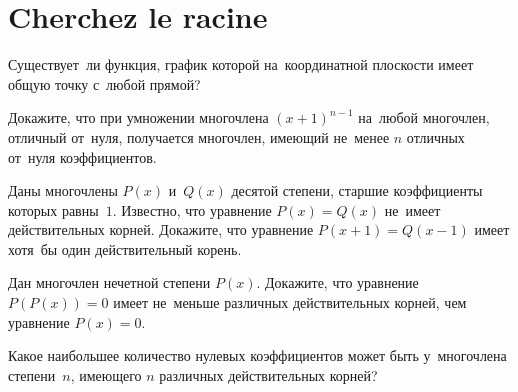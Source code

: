 
\section*{Cherchez le racine}


\begin{problems}

\item
Существует~ли функция, график которой на~координатной плоскости имеет общую
точку с~любой прямой?

\item
Докажите, что при умножении многочлена $(x + 1)^{n-1}$ на~любой многочлен,
отличный от~нуля, получается многочлен, имеющий не~менее $n$ отличных от~нуля
коэффициентов.

\item
Даны многочлены $P(x)$ и~$Q(x)$ десятой степени, старшие коэффициенты которых
равны~$1$.
Известно, что уравнение $P(x) = Q(x)$ не~имеет действительных корней.
Докажите, что уравнение $P(x + 1) = Q(x - 1)$ имеет хотя~бы один действительный
корень.

\item
Дан многочлен нечетной степени $P(x)$.
Докажите, что уравнение  $P(P(x)) = 0$ имеет не~меньше различных действительных
корней, чем уравнение $P(x) = 0$.

\item
Какое наибольшее количество нулевых коэффициентов может быть у~многочлена
степени~$n$, имеющего $n$ различных действительных корней?

\end{problems}


